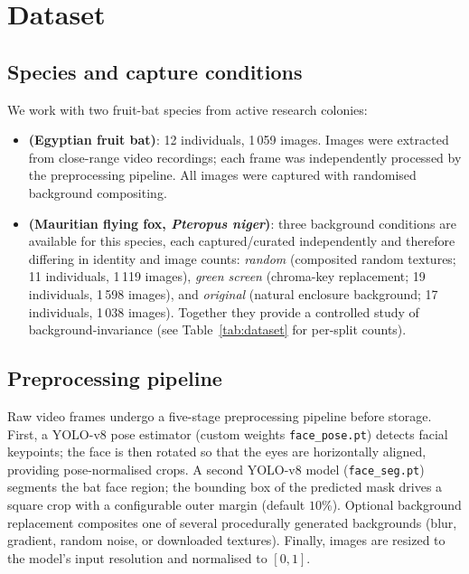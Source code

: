 \section{Dataset}
\label{sec:dataset}

\subsection{Species and capture conditions}

We work with two fruit-bat species from active research colonies:

\begin{itemize}[itemsep=2pt]
  \item \textbf{\rousettus (Egyptian fruit bat)}: 12 individuals, 1\,059 images.
        Images were extracted from close-range video recordings; each frame was
        independently processed by the preprocessing pipeline.  All images were captured
        with randomised background compositing.
  \item \textbf{\mauritius (Mauritian flying fox, \emph{Pteropus niger})}: three
        background conditions are available for this species, each captured/curated
        independently and therefore differing in identity and image counts:
        \emph{random} (composited random textures; 11 individuals, 1\,119 images),
        \emph{green screen} (chroma-key replacement; 19 individuals, 1\,598 images),
        and \emph{original} (natural enclosure background; 17 individuals, 1\,038
        images).  Together they provide a controlled study of background-invariance
        (see Table~\ref{tab:dataset} for per-split counts).
\end{itemize}

\subsection{Preprocessing pipeline}

Raw video frames undergo a five-stage preprocessing pipeline before storage.
First, a YOLO-v8 pose estimator (custom weights \texttt{face\_pose.pt}) detects facial
keypoints; the face is then rotated so that the eyes are horizontally aligned, providing
pose-normalised crops.  A second YOLO-v8 model (\texttt{face\_seg.pt}) segments the bat
face region; the bounding box of the predicted mask drives a square crop with a
configurable outer margin (default $10\%$).  Optional background replacement composites
one of several procedurally generated backgrounds (blur, gradient, random noise, or
downloaded textures).  Finally, images are resized to the model's input resolution and
normalised to $[0, 1]$.


